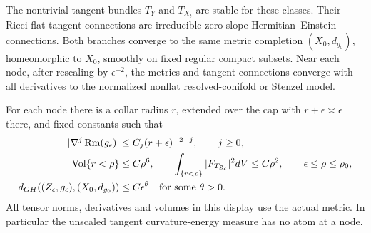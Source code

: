 \begin{proposition}\label{prop:tangent-metrics}
The nontrivial tangent bundles $T_Y$ and $T_{X_t}$ are stable for these
classes. Their Ricci-flat tangent connections are irreducible zero-slope
Hermitian--Einstein connections. Both branches converge to the same
metric completion $(X_0,d_{g_0})$, homeomorphic to $X_0$, smoothly on
fixed regular compact subsets. Near each node, after rescaling by
$\epsilon^{-2}$, the metrics and tangent connections converge with all
derivatives to the normalized nonflat resolved-conifold or Stenzel
model.

For each node there is a collar radius $r$, extended over the cap with
$r+\epsilon\asymp\epsilon$ there, and fixed constants such that
\begin{equation}\label{eq:tangent-bounds}
 \begin{aligned}
 |\nabla^j\operatorname{Rm}(g_\epsilon)|&\le C_j(r+\epsilon)^{-2-j},\qquad j\ge0,\\
 \operatorname{Vol}\{r<\rho\}&\le C\rho^6,\qquad
 \int_{\{r<\rho\}}|F_{T_{Z_\epsilon}}|^2dV\le C\rho^2,
 \qquad \epsilon\le\rho\le\rho_0,\\
 d_{GH}((Z_\epsilon,g_\epsilon),(X_0,d_{g_0}))&\le C\epsilon^\theta
 \quad\text{for some }\theta>0.
 \end{aligned}
\end{equation}
All tensor norms, derivatives and volumes in this display use the actual
metric. In particular the unscaled tangent curvature-energy measure has
no atom at a node.
\end{proposition}
